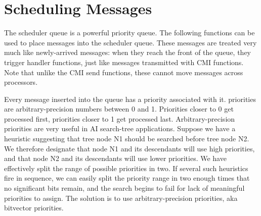 

\section{Scheduling Messages}
\label{schedqueue}

The scheduler queue is a powerful priority queue.  The following
functions can be used to place messages into the scheduler queue.
These messages are treated very much like newly-arrived messages: when
they reach the front of the queue, they trigger handler functions,
just like messages transmitted with CMI functions.  Note that unlike
the CMI send functions, these cannot move messages across processors.

Every message inserted into the queue has a priority associated with
it.  \converse{} priorities are arbitrary-precision numbers between 0 and
1.  Priorities closer to 0 get processed first, priorities closer to 1
get processed last.  Arbitrary-precision priorities are very useful in
AI search-tree applications. Suppose we have a heuristic suggesting
that tree node N1 should be searched before tree node N2. We therefore
designate that node N1 and its descendants will use high priorities,
and that node N2 and its descendants will use lower priorities. We
have effectively split the range of possible priorities in two. If
several such heuristics fire in sequence, we can easily split the
priority range in two enough times that no significant bits remain,
and the search begins to fail for lack of meaningful priorities to
assign. The solution is to use arbitrary-precision priorities, aka
bitvector priorities.

